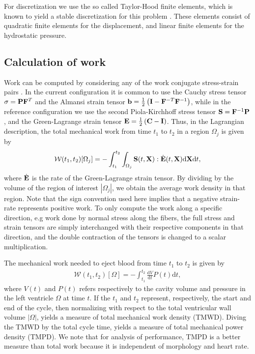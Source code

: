 For discretization we use the so called Taylor-Hood finite elements,
which is known to yield a stable discretization for this problem
\cite{arnold1984stable}. These elements consist of quadratic finite
elements for the displacement, and linear finite elements for
the hydrostatic pressure. 



\subsection{Calculation of work}
\label{paper4:sec:regional_work}

Work can be computed by considering any of the
work conjugate stress-strain pairs \cite{holzapfel2000nonlinear}. In
the current configuration it is common to use the Cauchy stress tensor
$\mathbf{\sigma} = \mathbf{P} \mathbf{F}^T$ and the Almansi strain tensor $\mathbf{b} =
\frac{1}{2} \left(\mathbf{I} -  \mathbf{F}^{-T} \mathbf{F}^{-1} \right)$, while in
the reference configuration we use the second Piola-Kirchhoff stress
tensor $\mathbf{S} = \mathbf{F}^{-1} \mathbf{P}$, and the Green-Lagrange strain
tensor $\mathbf{E} = \frac{1}{2}\left(\mathbf{C} - \mathbf{I} \right)$. Thus, in the Lagrangian
description, the total mechanical work from time $t_1$ to $t_2$ in a
region $\Omega_j$ is given by
\begin{align}
   \mathcal{W}(t_1, t_2)[\Omega_j] = 
  -\int_{t_1}^{t_2} \int_{\Omega_j}\mathbf{S}(t, \mathbf{X})
  : \dot{\mathbf{E}}(t, \mathbf{X}) \mathrm{d}\mathbf{X} \mathrm{d}t, 
\end{align}
where $ \dot{\mathbf{E}} $ is the rate of the Green-Lagrange strain tensor.
By dividing by the volume of the region of interest $| \Omega_j |$,
we obtain the average work density in that region. Note that the sign
convention used here implies that a negative strain-rate
represents positive work. To only compute the
work along a specific direction, e.g  work done by normal stress along the fibers, the full stress
and strain tensors are simply interchanged with their respective
components in that direction, and the double contraction of the tensors
is changed to a scalar multiplication.

The mechanical work needed to eject blood from time $t_1$ to
$t_2$ is given by
\begin{align}
   \mathcal{W}(t_1, t_2)[\Omega] = 
  -\int_{t_1}^{t_2} \frac{\mathrm{d}V}{\mathrm{d}t} P(t) \mathrm{d}t,
\end{align}
where $V(t)$ and $P(t)$ refers respectively to the cavity volume and pressure in
the left ventricle $\Omega$ at time $t$. If the $t_1$ and $t_2$
represent, respectively, the start and end of the cycle, then normalizing with respect to the
total ventricular wall volume  $| \Omega |$, yields a measure of
total mechanical work density (TMWD). Diving the TMWD by the total
cycle time, yields a measure of total mechanical power
density (TMPD). We note that for analysis of performance, TMPD is
a better measure than total work because it is independent of
morphology and heart rate.  

